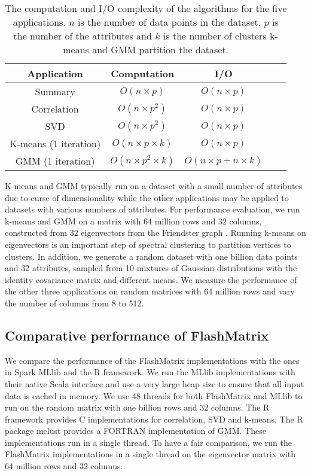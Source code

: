 \begin{table}
\begin{center}
\footnotesize
\begin{tabular}{|c|c|c|c|c|}
\hline
Application & Computation & I/O \\
\hline
Summary & $O(n \times p)$ & $O(n \times p)$ \\
\hline
Correlation & $O(n \times p^2)$ & $O(n \times p)$ \\
\hline
SVD & $O(n \times p^2)$ & $O(n \times p)$ \\
\hline
K-means (1 iteration) & $O(n \times p \times k)$ & $O(n \times p)$ \\
\hline
GMM (1 iteration) & $O(n \times p^2 \times k)$ & $O(n \times p + n \times k)$ \\
\hline
\end{tabular}
\normalsize
\end{center}
\caption{The computation and I/O complexity of the algorithms for the five
	applications. $n$ is the number of data points in the dataset, $p$ is
	the number of the attributes and $k$ is the number of clusters k-means and
GMM partition the dataset.}
\label{tbl:algs}
\end{table}

K-means and GMM typically run on a dataset with a small number of attributes
due to curse of dimensionality \cite{Jain00} while the other applications may
be applied to datasets with various numbers of attributes. For performance
evaluation, we run k-means and GMM on a matrix
with 64 million rows and 32 columns, constructed from 32 eigenvectors from
the Friendster graph \cite{friendster}. Running k-means on eigenvectors is
an important step of spectral clustering \cite{Luxburg07} to partition vertices
to clusters. In addition, we generate a random dataset with one billion data
points and 32 attributes, sampled from 10 mixtures of Gaussian distributions
with the identity covariance matrix and different means. We measure the performance
of the other three applications on random matrices with 64 million rows
and vary the number of columns from 8 to 512.

\subsection{Comparative performance of FlashMatrix}

We compare the performance of the FlashMatrix implementations with the ones in
Spark MLlib \cite{mllib} and the R framework. We run the MLlib implementations
with their native Scala interface and use a very large heap size to ensure that
all input data is cached in memory. We use 48 threads for both FlashMatrix and
MLlib to run on the random matrix with one billion rows and 32 columns.
The R framework provides C implementations for correlation, SVD and k-means.
The R package mclust \cite{mclust} provides a FORTRAN implementation of GMM.
These implementations run in a single thread. To have a fair comparison,
we run the FlashMatrix implementations in a single thread on the eigenvector
matrix with 64 million rows and 32 columns.


